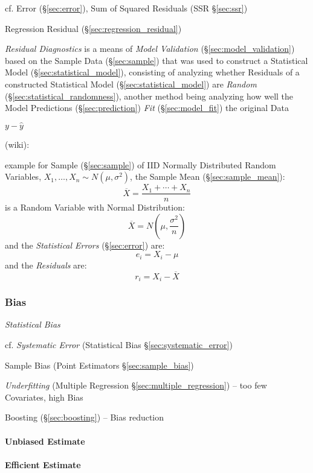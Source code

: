 cf. Error (\S\ref{sec:error}), Sum of Squared Residuals (SSR \S\ref{sec:ssr})

\fist Regression Residual (\S\ref{sec:regression_residual})

\emph{Residual Diagnostics} is a means of \emph{Model Validation}
(\S\ref{sec:model_validation}) based on the Sample Data (\S\ref{sec:sample})
that was used to construct a Statistical Model (\S\ref{sec:statistical_model}),
consisting of analyzing whether Residuals of a constructed Statistical Model
(\S\ref{sec:statistical_model}) are \emph{Random}
(\S\ref{sec:statistical_randomness}), another method being analyzing how well
the Model Predictions (\S\ref{sec:prediction}) \emph{Fit}
(\S\ref{sec:model_fit}) the original Data

$y - \hat{y}$

(wiki):

example for Sample (\S\ref{sec:sample}) of IID Normally Distributed Random
Variables, $X_1, \ldots, X_n \sim N(\mu, \sigma^2)$, the Sample Mean
(\S\ref{sec:sample_mean}):
\[
  \overline{X} = \frac{X_1 + \cdots + X_n}{n}
\]
is a Random Variable with Normal Distribution:
\[
  \overline{X} = N(\mu, \frac{\sigma^2}{n})
\]
and the \emph{Statistical Errors} (\S\ref{sec:error}) are:
\[
  e_i = X_i - \mu
\]
and the \emph{Residuals} are:
\[
  r_i = X_i - \overline{X}
\]



\subsubsection{Bias}\label{sec:bias}

\emph{Statistical Bias}

cf. \emph{Systematic Error} (Statistical Bias \S\ref{sec:systematic_error})

Sample Bias (Point Estimators \S\ref{sec:sample_bias})

\emph{Underfitting} (Multiple Regression \S\ref{sec:multiple_regression}) -- too
few Covariates, high Bias

Boosting (\S\ref{sec:boosting}) -- Bias reduction



\paragraph{Unbiased Estimate}\label{sec:unbiased_estimate}\hfill

\paragraph{Efficient Estimate}\label{sec:efficient_estimate}\hfill

